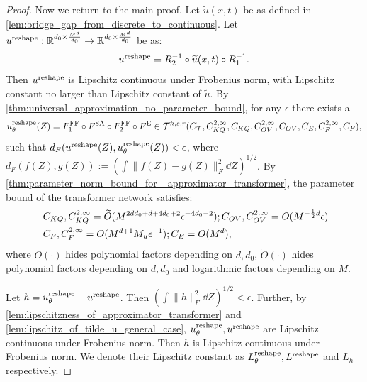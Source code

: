 \documentclass[12pt]{article}
\numberwithin{equation}{section}
\let\tilde\widetilde
\newcommand{\wt}{\widetilde}
\renewcommand{\tilde}{\wt}
\def\R{\mathbb{R}}
\theoremstyle{theoremstyle}
\numberwithin{equation}{section}
\numberwithin{theorem}{section}
\numberwithin{proposition}{section}
\numberwithin{definition}{section}
\numberwithin{lemma}{section}
\numberwithin{assumption}{section}
\numberwithin{remark}{section}
\begin{document}
\begin{proof}
Now we return to the main proof.
Let $\tilde{u}(x,t)$ be as defined in \cref{lem:bridge_gap_from_discrete_to_continuous}.
Let $u^{\rm reshape}:\R^{d_0\times \frac{M^d}{d_0}}\to \R^{d_0\times \frac{M^d}{d_0}}$ be as:
\begin{align*}
    u^{\rm reshape}=R_2^{-1}\circ\tilde{u}(x,t)\circ R_1^{-1}.
\end{align*}
Then $ u^{\rm reshape}$ is Lipschitz continuous under Frobenius norm, with Lipschitz constant no larger than Lipschitz constant of $\tilde{u}$.
By \cref{thm:universal_approximation_no_parameter_bound}, for any $\epsilon$ there exists a
\begin{align*}
    u_\theta^{\rm reshape}(Z)= F^{\rm FF}_1\circ F^{\rm SA}\circ F^{\rm FF}_2\circ F^{\rm E}\in\mathcal{T}^{h,s,r}(C_\mathcal{T},C^{2,\infty}_{KQ},C_{KQ},C^{2,\infty}_{OV},C_{OV},C_{E},C^{2,\infty}_{F},C_{F}),
\end{align*}
such that $d_F(u^{\rm reshape}(Z),u_\theta^{\rm reshape}(Z))<\epsilon$, where $d_F(f(Z),g(Z)):=(\int\|f(Z)-g(Z)\|^2_F\dd Z)^{1/2}$.
By \cref{thm:parameter_norm_bound_for _approximator_transformer}, the parameter bound of the transformer network satisfies:
\begin{align}\label{eq:bound_of_parameter_main_proof_stat_rate}
    & ~C_{KQ},C^{2,\infty}_{KQ}=\tilde{O}(M^{2dd_0+d+4d_0+2}\epsilon^{-4d_0-2});C_{OV},C^{2,\infty}_{OV}=O(M^{-\frac{1}{2}d}\epsilon) \notag\\
    & ~C_{F},C^{2,\infty}_{F}=O(M^{d+1}M_u\epsilon^{-1});C_E=O(M^d),
\end{align}
where $O(\cdot)$ hides polynomial factors depending on $d,d_0$, $\tilde{O}(\cdot)$ hides polynomial factors depending on $d,d_0$ and logarithmic factors depending on $M$.

Let $h=u_\theta^{\rm reshape}-u^{\rm reshape}$. 
Then $(\int\|h\|_F^2\dd Z)^{1/2}<\epsilon$.
Further, by \cref{lem:lipschitzness_of_approximator_transformer} and \cref{lem:lipschitz_of_tilde_u_general_case}, $u_\theta^{\rm reshape},u^{\rm reshape}$ are Lipschitz continuous under Frobenius norm. 
Then $h$ is Lipschitz continuous under Frobenius norm.
We denote their Lipschitz constant as $L_\theta^{\rm reshape},L^{\rm reshape}$ and $L_h$ respectively.


\end{proof}
\end{document}
